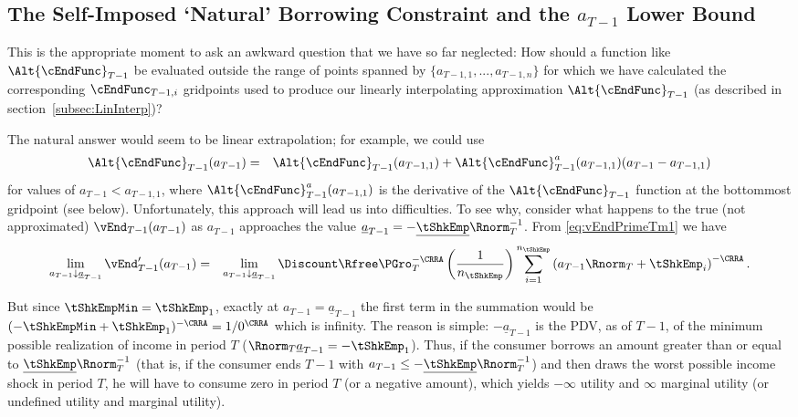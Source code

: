 \documentclass[titlepage]{\econtex}
\begin{document}
\hypertarget{The-Self-Imposed-Natural-Borrowing-Constraint-and-the-a-Lower-Bound}{}
\subsection{The Self-Imposed `Natural' Borrowing Constraint and the $a_{T-1}$ Lower Bound} \label{subsec:LiqConstrSelfImposed}


This is the appropriate moment to ask an awkward question that we have so far
neglected: How should a function like $\Alt{\cEndFunc}_{T-1}$
be evaluated outside the range of points spanned by
$\{{a}_{T-1,1},...,{a}_{T-1,n}\}$ for which we have calculated
the corresponding $\cEndFunc_{T-1,i}$ gridpoints used to produce our
linearly interpolating approximation $\Alt{\cEndFunc}_{T-1}$ (as described in section~\ref{subsec:LinInterp})?

The natural answer would seem to be linear extrapolation; for example, we could use
\begin{eqnarray}
  \Alt{\cEndFunc}_{T-1}({a}_{T-1}) &  = & \Alt{\cEndFunc}_{T-1}({a}_{T-1,1})+\Alt{\cEndFunc}_{T-1}^{{a}}({a}_{T-1,1})({a}_{T-1}-{a}_{T-1,1}) \label{eq:ExtrapLin}
\end{eqnarray}
for values of ${a}_{T-1} < {a}_{T-1,1}$, where $\Alt{\cEndFunc}_{T-1}^{{a}}({a}_{T-1,1})$ is the derivative of the $\Alt{\cEndFunc}_{T-1}$ function at the bottommost gridpoint (see below).  Unfortunately, this approach
will lead us into difficulties.  To see why, consider what
happens to the true (not approximated) $\vEnd_{T-1}({a}_{T-1})$ as
${a}_{T-1}$ approaches the value
$\underline{a}_{T-1}=-\underline{\tShkEmp}\Rnorm_{T}^{-1}$.  From
\eqref{eq:vEndPrimeTm1} we have
\begin{eqnarray}
        \lim_{{a}_{T-1} \downarrow \underline{a}_{T-1}} \vEnd_{T-1}^{\prime}({a}_{T-1}) & = &
        \lim_{{a}_{T-1} \downarrow \underline{a}_{T-1}} \Discount \Rfree \PGro_{T}^{-\CRRA} \left(\frac{1}{n_{\tShkEmp}}\right) \sum_{i=1}^{n_{\tShkEmp}} \left( {a}_{T-1} \Rnorm_{T}+ \tShkEmp_{i}\right)^{-\CRRA}.
\end{eqnarray}

But since $\tShkEmpMin=\tShkEmp_{1}$, exactly at
${a}_{T-1}=\underline{a}_{T-1}$ the first term in the summation would
be $(-\tShkEmpMin+\tShkEmp_{1})^{-\CRRA}=1/0^{\CRRA}$ which is
infinity.  The reason is simple: $-\underline{a}_{T-1}$ is
the PDV, as of $T-1$, of the minimum possible realization of income in
period $T$ ($\Rnorm_{T}\underline{a}_{T-1} = -\tShkEmp_{1}$).  Thus,
if the consumer borrows an amount greater than or equal to
$\underline{\tShkEmp}\Rnorm_{T}^{-1}$ (that is, if the consumer ends
$T-1$ with ${a}_{T-1} \leq -\underline{\tShkEmp}\Rnorm_{T}^{-1}$) and
then draws the worst possible income shock in period $T$, he will have
to consume zero in period $T$ (or a negative amount), which yields
$-\infty$ utility and $\infty$ marginal utility (or undefined utility
and marginal utility).
\end{document}
